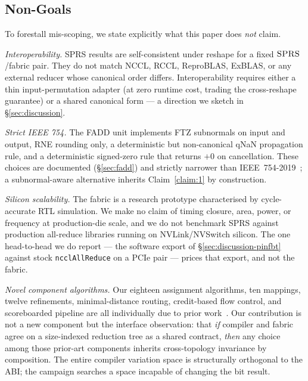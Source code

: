 \documentclass[journal,10pt]{IEEEtran}
\theoremstyle{plain}
\theoremstyle{definition}
\theoremstyle{remark}
\newcommand{\sprs}{\textsc{SPRS}}
\begin{document}
\subsection{Non-Goals}

To forestall mis-scoping, we state explicitly what this paper does
\emph{not} claim.

\emph{Interoperability.} \sprs{} results are self-consistent under reshape
for a fixed $\sprs{}$/fabric pair. They do not match NCCL, RCCL,
ReproBLAS, ExBLAS, or any external reducer whose canonical order differs.
Interoperability requires either a thin input-permutation adapter (at
zero runtime cost, trading the cross-reshape guarantee) or a shared
canonical form --- a direction we sketch in \S\ref{sec:discussion}.

\emph{Strict IEEE 754.} The FADD unit implements FTZ subnormals on input
and output, RNE rounding only, a deterministic but non-canonical qNaN
propagation rule, and a deterministic signed-zero rule that returns $+0$
on cancellation. These choices are documented (\S\ref{sec:fadd}) and
strictly narrower than IEEE~754-2019~\cite{ieee754-2019}; a subnormal-aware
alternative inherits Claim~\ref{claim:1} by construction.

\emph{Silicon scalability.} The fabric is a research prototype
characterised by cycle-accurate RTL simulation. We make no claim of timing closure, area, power, or
frequency at production-die scale, and we do not benchmark \sprs{} against
production all-reduce libraries running on NVLink/NVSwitch silicon. The one
head-to-head we do report --- the software export of
\S\ref{sec:discussion-pinfbt} against stock \texttt{ncclAllReduce} on a PCIe
pair --- prices that export, and not the fabric.

\emph{Novel component algorithms.} Our eighteen assignment algorithms, ten
mappings, twelve refinements, minimal-distance routing, credit-based flow
control, and scoreboarded pipeline are all individually due to
prior work~\cite{topcuoglu2002heft,lukes1974efficient,fiduccia1982linear,%
yang1994dsc,karypis1998multilevel,jeannot2014treematch,%
dally1987deadlock,dally2004principles}. Our contribution is not a new component
but the interface observation: that \emph{if} compiler and fabric agree
on a size-indexed reduction tree as a shared contract, \emph{then} any
choice among those prior-art components inherits cross-topology invariance
by composition. The entire compiler variation space is structurally
orthogonal to the ABI; the campaign searches a space incapable of changing
the bit result.
\end{document}
